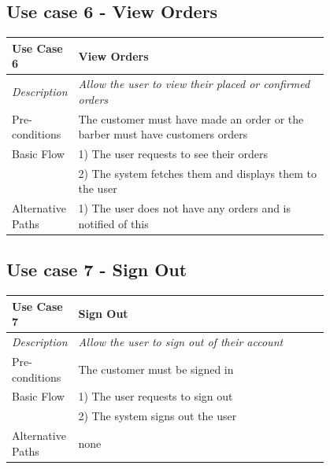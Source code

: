 \documentclass[12pt]{article}
\begin{document}
	\subsection{Use case 6 - View Orders}
	\label{chap:use-cases-6}
	\begin{table}[H]
		\begin{tabular}{|l|p{0.8\linewidth}}
			\hline
			\rowcolor[HTML]{EFEFEF} 
			\textbf{Use Case 6}  & \textbf{View Orders}                                                          \\ \hline
			\rowcolor[HTML]{F5FBFF} 
			\textit{Description} & \textit{Allow the user to view their placed or confirmed orders}              \\ \hline
			\rowcolor[HTML]{EFEFEF} 
			Pre-conditions       & The customer must have made an order or the barber must have customers orders \\ \hline
			\rowcolor[HTML]{F5FBFF} 
			Basic Flow           & 1) The user requests to see their orders                                      \\
			\rowcolor[HTML]{F5FBFF} 
			& 2) The system fetches them and displays them to the user                      \\ \hline
			\rowcolor[HTML]{EFEFEF} 
			Alternative Paths    & 1) The user does not have any orders and is notified of this                 
		\end{tabular}
	\end{table}
		
	\subsection{Use case 7 - Sign Out}
	\label{chap:use-cases-7}
	\begin{table}[H]
		\begin{tabular}{|l|p{0.8\linewidth}}
			\hline
			\rowcolor[HTML]{EFEFEF} 
			\textbf{Use Case 7}  & \textbf{Sign Out}                                    \\ \hline
			\rowcolor[HTML]{F5FBFF} 
			\textit{Description} & \textit{Allow the user to sign out of their account} \\ \hline
			\rowcolor[HTML]{EFEFEF} 
			Pre-conditions       & The customer must be signed in                       \\ \hline
			\rowcolor[HTML]{F5FBFF} 
			Basic Flow           & 1) The user requests to sign out                     \\
			\rowcolor[HTML]{F5FBFF} 
			& 2) The system signs out the user                     \\ \hline
			\rowcolor[HTML]{EFEFEF} 
			Alternative Paths    & none                                                
		\end{tabular}
	\end{table}
\end{document}
